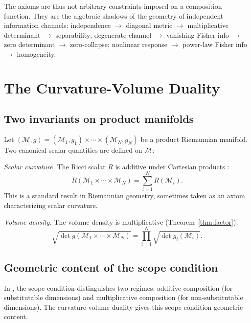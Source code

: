 \documentclass[12pt, a4paper]{article}
\theoremstyle{definition}
\theoremstyle{remark}
\begin{document}
The axioms are thus not arbitrary constraints imposed on a composition function. They are the algebraic shadows of the geometry of independent information channels: independence $\to$ diagonal metric $\to$ multiplicative determinant $\to$ separability; degenerate channel $\to$ vanishing Fisher info $\to$ zero determinant $\to$ zero-collapse; nonlinear response $\to$ power-law Fisher info $\to$ homogeneity.

\section{The Curvature-Volume Duality}\label{sec:duality}

\subsection{Two invariants on product manifolds}

Let $(\mathcal{M}, g) = (\mathcal{M}_1, g_1) \times \cdots \times (\mathcal{M}_N, g_N)$ be a product Riemannian manifold. Two canonical scalar quantities are defined on $\mathcal{M}$:

\textit{Scalar curvature.} The Ricci scalar $R$ is additive under Cartesian products \cite{wikiscalar}:
\begin{equation}\label{eq:curvadd}
R(\mathcal{M}_1 \times \cdots \times \mathcal{M}_N) = \sum_{i=1}^{N} R(\mathcal{M}_i).
\end{equation}
This is a standard result in Riemannian geometry, sometimes taken as an axiom characterizing scalar curvature.

\textit{Volume density.} The volume density is multiplicative (Theorem~\ref{thm:factor}):
\begin{equation}\label{eq:volmult}
\sqrt{\det g(\mathcal{M}_1 \times \cdots \times \mathcal{M}_N)} = \prod_{i=1}^{N} \sqrt{\det g_i(\mathcal{M}_i)}.
\end{equation}

\subsection{Geometric content of the scope condition}

In \cite{kirsch2026mc}, the scope condition distinguishes two regimes: additive composition (for substitutable dimensions) and multiplicative composition (for non-substitutable dimensions). The curvature-volume duality gives this scope condition geometric content.
\end{document}
